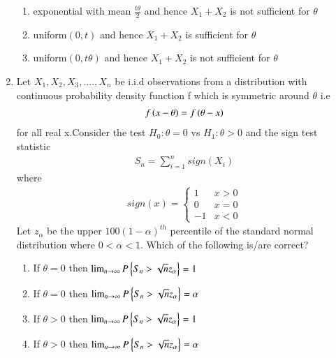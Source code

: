 \begin{enumerate}[label=\thesection.\arabic*.,ref=\thesection.\theenumi]
\begin{enumerate}
    \item exponential with mean $\frac{t\theta}{2}$ and hence $X_1+X_2$ is not sufficient for $\theta$ \label{june/2013/40/option 2}
    \item uniform$(0,t)$ and hence $X_1+X_2$ is sufficient for $\theta$ \label{june/2013/40/option 3}
    \item uniform$(0,t\theta)$ and hence $X_1+X_2$ is not sufficient for $\theta$ \label{june/2013/40/option 4}
\end{enumerate}
%
\solution

%
\item Let $X_1,X_2,X_3,....,X_n$ be i.i.d observations from a distribution with continuous probability density function f which is symmetric around $\theta$ i.e
\begin{align}
    f\left(x-\theta\right)=f\left(\theta -x\right)
\end{align}
for all real x.Consider the test $H_0: \theta =0$ vs $H_1:  \theta >0$ and the sign test statistic
\begin{align}
    S_n = \sum_{i=1}^{n} sign(X_i)
\end{align}
where
\begin{align}
    sign(x) =
    \begin{cases}
    1  & x>0\\
    0  & x=0\\
    -1 & x<0
    \end{cases}
\end{align}
Let $z_\alpha$ be the upper $100(1-\alpha)^{th}$ percentile of the standard normal distribution where $0<\alpha <1$. Which of the following is/are correct?
\begin{enumerate}
    \item If $\theta =0$ then $ \lim_{n\to\infty} P\left\{S_n > \sqrt{n}z_{\alpha}\right\} =1 $\\
    \item If $\theta =0$ then $ \lim_{n\to\infty} P\left\{S_n > \sqrt{n}z_{\alpha}\right\} =\alpha $\\
    \item If $\theta >0$ then $ \lim_{n\to\infty} P\left\{S_n > \sqrt{n}z_{\alpha}\right\} = 1 $\\
    \item If $\theta >0$ then $ \lim_{n\to\infty} P\left\{S_n > \sqrt{n}z_{\alpha}\right\} =\alpha $
\end{enumerate}
%
\solution

%
  

\end{enumerate}